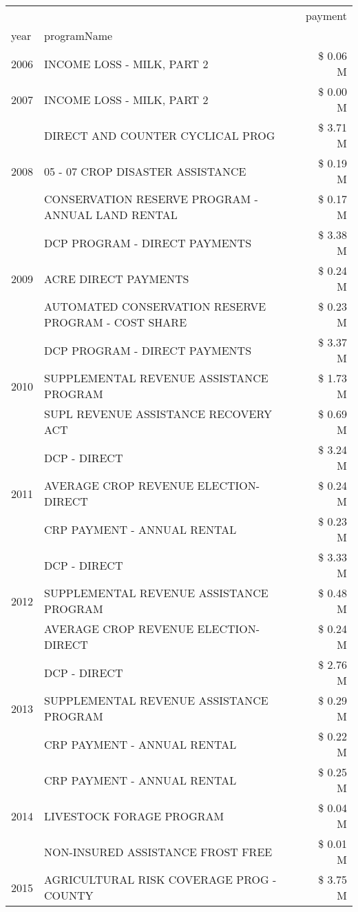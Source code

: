 \begin{tabular}{llr}
\toprule
 &  & payment \\
year & programName &  \\
\midrule
2006 & INCOME LOSS - MILK, PART 2 & \$ 0.06 M \\
\cline{1-3}
2007 & INCOME LOSS - MILK, PART 2 & \$ 0.00 M \\
\cline{1-3}
\multirow[t]{3}{*}{2008} & DIRECT AND COUNTER CYCLICAL PROG & \$ 3.71 M \\
 & 05 - 07 CROP DISASTER ASSISTANCE & \$ 0.19 M \\
 & CONSERVATION RESERVE PROGRAM - ANNUAL LAND RENTAL & \$ 0.17 M \\
\cline{1-3}
\multirow[t]{3}{*}{2009} & DCP PROGRAM - DIRECT PAYMENTS & \$ 3.38 M \\
 & ACRE DIRECT PAYMENTS & \$ 0.24 M \\
 & AUTOMATED CONSERVATION RESERVE PROGRAM - COST SHARE & \$ 0.23 M \\
\cline{1-3}
\multirow[t]{3}{*}{2010} & DCP PROGRAM - DIRECT PAYMENTS & \$ 3.37 M \\
 & SUPPLEMENTAL REVENUE ASSISTANCE PROGRAM & \$ 1.73 M \\
 & SUPL REVENUE ASSISTANCE RECOVERY ACT & \$ 0.69 M \\
\cline{1-3}
\multirow[t]{3}{*}{2011} & DCP - DIRECT & \$ 3.24 M \\
 & AVERAGE CROP REVENUE ELECTION-DIRECT & \$ 0.24 M \\
 & CRP PAYMENT - ANNUAL RENTAL & \$ 0.23 M \\
\cline{1-3}
\multirow[t]{3}{*}{2012} & DCP - DIRECT & \$ 3.33 M \\
 & SUPPLEMENTAL REVENUE ASSISTANCE PROGRAM & \$ 0.48 M \\
 & AVERAGE CROP REVENUE ELECTION-DIRECT & \$ 0.24 M \\
\cline{1-3}
\multirow[t]{3}{*}{2013} & DCP - DIRECT & \$ 2.76 M \\
 & SUPPLEMENTAL REVENUE ASSISTANCE PROGRAM & \$ 0.29 M \\
 & CRP PAYMENT - ANNUAL RENTAL & \$ 0.22 M \\
\cline{1-3}
\multirow[t]{3}{*}{2014} & CRP PAYMENT - ANNUAL RENTAL & \$ 0.25 M \\
 & LIVESTOCK FORAGE PROGRAM & \$ 0.04 M \\
 & NON-INSURED ASSISTANCE FROST FREE & \$ 0.01 M \\
\cline{1-3}
\multirow[t]{3}{*}{2015} & AGRICULTURAL RISK COVERAGE PROG - COUNTY & \$ 3.75 M \\

\end{tabular}

